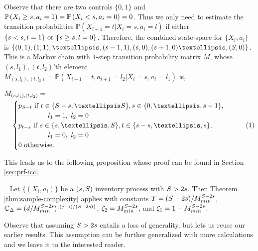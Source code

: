\documentclass[opre,sglanonrev]{informs4}
\numberwithin{equation}{section}
\newcommand{\lp}{\left(}
\newcommand{\rp}{\right)}
\newcommand{\Cbb}{\mathbb{C}}
\newcommand{\Pbb}{\mathbb{P}}
\newcommand\numberthis{\addtocounter{equation}{1}\tag{\theequation}}
\newcommand{\prob}{\Pbb}
\begin{document}
{{{Observe that there are two controls $\{0,1\}$ and $\prob\lp X_i\geq\texttt{\textbf{s}},a_i=1\rp=\prob\lp X_i<\texttt{\textbf{s}},a_i=0\rp=0$. Thus we only need to estimate the transition probabilities $\prob(X_{i+1}=t|X_i=s,a_i=l)$ if either $\{s<\texttt{\textbf{s}}, l=1\} \text{ or } \{s\geq\texttt{\textbf{s}},l=0\}$. Therefore, the combined state-space for $\{X_i,a_i\}$ is $\{(0,1),(1,1),\dots,(\texttt{\textbf{s}}-1,1),(\texttt{\textbf{s}},0),(\texttt{\textbf{s}}+1,0)\dots,(\texttt{\textbf{S}},0)\}$. This is a Markov chain with {$1$-step transition probability matrix} $M$, whose $(s,l_1),(t,l_2)$'th element $M_{(s,l_1),(t,l_2)}=\prob(X_{i+1}=t,a_{i+1}=l_2|X_i=s,a_i=l_1)$ is,
\begin{small}
\begin{align*}
    &M_{(s,l_1),(t,l_2)} =  \\
    &\quad \begin{cases}
        p_{ \texttt{\textbf{S}}-t} \text{ if } t\in\{\texttt{\textbf{S}}-\texttt{\textbf{s}},\dots\texttt{\textbf{S}}\}, s\in \{0,\dots,\texttt{\textbf{s}}-1\},\\
        \qquad \qquad\ l_1=1,\ l_2=0\\
        p_{t-\texttt{\textbf{s}}} \text{ if } s\in\{\texttt{\textbf{s}},\dots,\texttt{\textbf{S}}\}, t\in\{s-\texttt{\textbf{s},\dots,s}\},\\
        \qquad \qquad \ l_1=0,\ l_2=0 \\
        0 \text{ otherwise. }
    \end{cases}\numberthis\label{eq:inventory-controldef}
\end{align*}    
\end{small}
This leads us to the following proposition whose proof can be found in Section \ref{sec:prf-icc}.
\begin{proposition}~\label{prop:ic-control}
    Let $\{(X_i,a_i)\}$ be a $(\texttt{\textbf{s}},\texttt{\textbf{S}})$ inventory process with $\texttt{\textbf{S}} > 2\texttt{\textbf{s}}$. Then Theorem \ref{thm:sample-complexity} applies with constants $T=(\texttt{\textbf{S}}-2\texttt{\textbf{s}})/M_{min}^{\texttt{\textbf{S}}-2\texttt{\textbf{s}}}$, $\Cbb_{\Delta} = (d/M_{min}^{\texttt{\textbf{S}}-2\texttt{\textbf{s}}})^{\lfloor(j-i)/(\texttt{\textbf{S}}-2\texttt{\textbf{s}})\rfloor}$, $\zeta_2 = M_{min}^{\texttt{\textbf{S}}-2\texttt{\textbf{s}}}$, and $\zeta_1=1-M_{min}^{\texttt{\textbf{S}}-2\texttt{\textbf{s}}}$.
\end{proposition}

\begin{remark}
    Observe that assuming $\texttt{\textbf{S}}>2\texttt{\textbf{s}}$ entails a loss of generality, but lets us reuse our earlier results.
    This assumption can be further generalized with more calculations and we leave it to the interested reader.
\end{remark}

}}}
\end{document}
